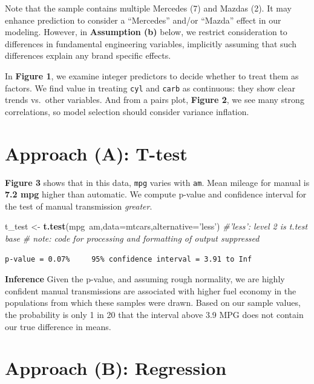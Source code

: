 \documentclass[]{article}
\newenvironment{Shaded}{\begin{snugshade}}{\end{snugshade}}
\newcommand{\KeywordTok}[1]{\textcolor[rgb]{0.13,0.29,0.53}{\textbf{{#1}}}}
\newcommand{\DataTypeTok}[1]{\textcolor[rgb]{0.13,0.29,0.53}{{#1}}}
\newcommand{\StringTok}[1]{\textcolor[rgb]{0.31,0.60,0.02}{{#1}}}
\newcommand{\CommentTok}[1]{\textcolor[rgb]{0.56,0.35,0.01}{\textit{{#1}}}}
\newcommand{\NormalTok}[1]{{#1}}
\begin{document}
Note that the sample contains multiple Mercedes (7) and Mazdas (2). It
may enhance prediction to consider a ``Mercedes'' and/or ``Mazda''
effect in our modeling. However, in \textbf{Assumption (b)} below, we
restrict consideration to differences in fundamental engineering
variables, implicitly assuming that such differences explain any brand
specific effects.

In \textbf{Figure 1}, we examine integer predictors to decide whether to
treat them as factors. We find value in treating \texttt{cyl} and
\texttt{carb} as continuous: they show clear trends vs.~other variables.
And from a pairs plot, \textbf{Figure 2}, we see many strong
correlations, so model selection should consider variance inflation.

\section{Approach (A): T-test}\label{approach-a-t-test}

\textbf{Figure 3} shows that in this data, \texttt{mpg} varies with
\texttt{am}. Mean mileage for manual is \textbf{7.2 mpg} higher than
automatic. We compute p-value and confidence interval for the test of
manual transmission \emph{greater}.

\begin{Shaded}
\begin{Highlighting}[]
\NormalTok{t_test <-}\StringTok{ }\KeywordTok{t.test}\NormalTok{(mpg~am,}\DataTypeTok{data=}\NormalTok{mtcars,}\DataTypeTok{alternative=}\StringTok{'less'}\NormalTok{) }\CommentTok{#'less': level 2 is t.test base}
\CommentTok{# note: code for processing and formatting of output suppressed}
\end{Highlighting}
\end{Shaded}

\begin{verbatim}
p-value = 0.07%     95% confidence interval = 3.91 to Inf
\end{verbatim}

\textbf{Inference} Given the p-value, and assuming rough normality, we
are highly confident manual transmissions are associated with higher
fuel economy in the populations from which these samples were drawn.
Based on our sample values, the probability is only 1 in 20 that the
interval above 3.9 MPG does not contain our true difference in means.

\section{Approach (B): Regression}\label{approach-b-regression}
\end{document}
